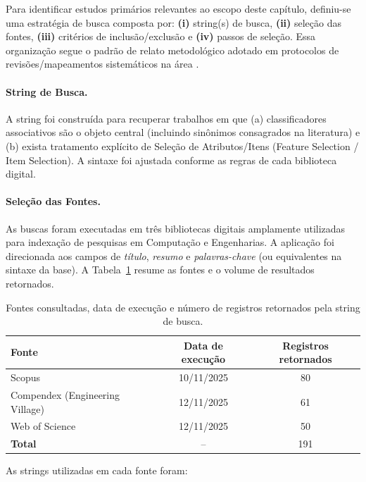 Para identificar estudos primários relevantes ao escopo deste capítulo, definiu-se uma estratégia
de busca composta por: \textbf{(i)} string(s) de busca, \textbf{(ii)} seleção das fontes, \textbf{(iii)} critérios
de inclusão/exclusão e \textbf{(iv)} passos de seleção. Essa organização segue o padrão de
relato metodológico adotado em protocolos de revisões/mapeamentos sistemáticos na área
\cite{kitchenham2007guidelines,dermeval2020mapeamento}.

\paragraph*{String de Busca.}
A string foi construída para recuperar trabalhos em que (a) classificadores associativos são o
objeto central (incluindo sinônimos consagrados na literatura) e (b) exista tratamento explícito de
Seleção de Atributos/Itens (Feature Selection / Item Selection). A sintaxe foi ajustada conforme as
regras de cada biblioteca digital.

\paragraph*{Seleção das Fontes.}
As buscas foram executadas em três bibliotecas digitais amplamente utilizadas para indexação de
pesquisas em Computação e Engenharias. A aplicação foi direcionada aos campos de \textit{título},
\textit{resumo} e \textit{palavras-chave} (ou equivalentes na sintaxe da base). A Tabela~\ref{tab:fontes_busca}
resume as fontes e o volume de resultados retornados.

\begin{table}[htbp]
\centering
\caption{Fontes consultadas, data de execução e número de registros retornados pela string de busca.}
\label{tab:fontes_busca}
\renewcommand{\arraystretch}{1.2}
\begin{tabular}{|l|c|c|}
\hline
\textbf{Fonte} & \textbf{Data de execução} & \textbf{Registros retornados} \\
\hline
Scopus & 10/11/2025 & 80 \\
Compendex (Engineering Village) & 12/11/2025 & 61 \\
Web of Science & 12/11/2025 & 50 \\
\hline
\textbf{Total} & -- & 191 \\
\hline
\end{tabular}
\end{table}

\noindent As strings utilizadas em cada fonte foram:

